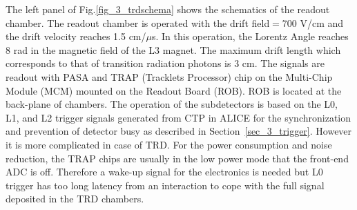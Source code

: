 The left panel of Fig.\ref{fig_3_trdschema} shows the schematics of the readout chamber. 
The readout chamber is operated with the drift field$=$700 V/cm and the drift velocity reaches 1.5 cm/$\mu$s.
In this operation, the Lorentz Angle reaches 8 rad in the magnetic field of the L3 magnet. 
The maximum drift length which corresponds to that of transition radiation photons is 3 cm. 
The signals are readout with PASA and TRAP (Tracklets Processor) chip on the Multi-Chip Module (MCM) mounted on the Readout Board (ROB). ROB is located at the back-plane of chambers.%
The operation of the subdetectors is based on the L0, L1, and L2 trigger signals generated from CTP in ALICE for the synchronization and prevention of detector busy as described in Section~\ref{sec_3_trigger}. 
However it is more complicated in case of TRD. 
For the power consumption and noise reduction, the TRAP chips are usually in the low power mode that the front-end ADC is off. 
Therefore a wake-up signal for the electronics is needed but L0 trigger has too long latency from an interaction to cope with the full signal deposited in the TRD chambers. 
